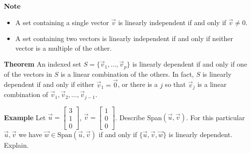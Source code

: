   \begin{frame}[fragile]
\textbf{Note}
\begin{itemize}
\item A set containing a single vector $\vec{v}$ is linearly independent
if and only if $\vec{v} \neq 0$.
\item A set containing two vectors is linearly independent if and only if neither
vector is a multiple of the other.
\end{itemize}

%
%
%
%
\end{frame}

  \begin{frame}[fragile]
\textbf{Theorem} 
 An indexed set $S = \{ \vec{v}_1, \dots , \vec{v}_p \}$ is linearly dependent
 if and only if one of the vectors in $S$ is a linear combination of the others.
 In fact, $S$ is linearly dependent if and only if either 
 $\vec{v}_1 = \vec{0}$, or there is a $j$ so that 
 $\vec{v}_j$ is a linear combination of 
 $\vec{v}_1, \vec{v}_2, \dots, \vec{v}_{j-1}$.

%
%
%
%
\end{frame}

  \begin{frame}[fragile]
\textbf{Example}
Let $\vec{u} = \left[\begin{array}{r} 3 \\ 1 \\ 0 \end{array}\right]$, 
$\vec{v} = \left[\begin{array}{r} 1 \\ 0 \\ 0 \end{array}\right]$.  Describe 
Span$(\vec{u}, \vec{v})$.
For this particular $\vec{u}, \vec{v}$ we have 
$\vec{w} \in \mbox{Span}(\vec{u}, \vec{v})$ if and only if 
$\{ \vec{u}, \vec{v}, \vec{w} \}$ is linearly dependent.  Explain.

\end{frame}

